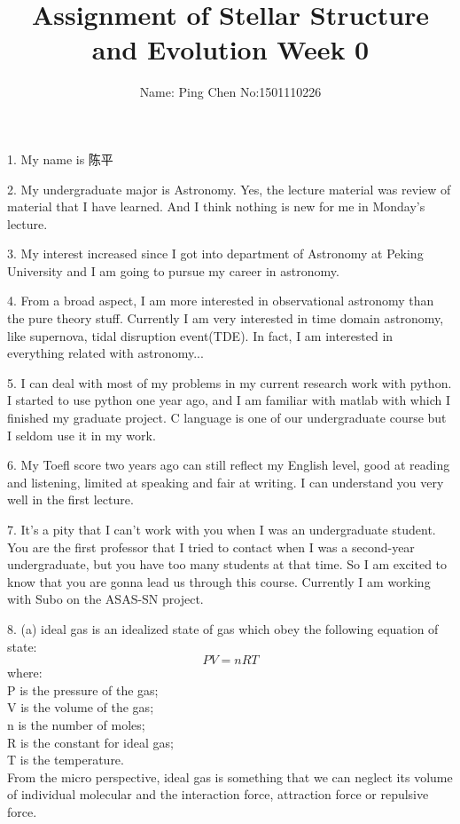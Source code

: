 \documentclass[11pt]{article}
\begin{document}
\pagestyle{plain}

\begin{CJK}{UTF8}{gbsn}

\title{Assignment of Stellar Structure and Evolution  Week 0}
\author{Name: Ping Chen\hspace{0.7cm} No:1501110226}
\maketitle

1. My name is 陈平  

2. My undergraduate major is Astronomy. Yes, the lecture material was review of material that I have learned. And I think nothing is new for me in Monday's lecture.

3. My interest increased since I got into department of Astronomy at Peking University and I am going to pursue my career in astronomy.

4. From a broad aspect, I am more interested in observational astronomy than the pure theory stuff. Currently I am very interested in time domain astronomy, like supernova, tidal disruption event(TDE). In fact, I am interested in everything related with astronomy...

5. I can deal with most of my problems in my current research work with python. I started to use python one year ago, and I am familiar with matlab with which I finished my graduate project. C language is one of our undergraduate course but I seldom use it in my work.

6. My Toefl score two years ago can still reflect my English level, good at reading and listening, limited at speaking and fair at writing. I can understand you very well in the first lecture.

7. It's a pity that I can't work with you when I was an undergraduate student. You are the first professor that I tried to contact when I was a second-year undergraduate, but you have too many students at that time. So I am excited to know that you are gonna lead us through this course. Currently I am working with Subo on the ASAS-SN project. 

8. (a) ideal gas is an idealized state of gas which obey the following equation of state: $$PV = nRT$$ where:\\ P is the pressure of the gas;\\ V is the volume of the gas;\\ n is the number of moles; \\ R  is the constant for ideal gas; \\ T is the temperature.\\
From the micro perspective, ideal gas is something that we can neglect its volume of individual molecular and the interaction force, attraction force or repulsive force.


\end{CJK}
\end{document}
